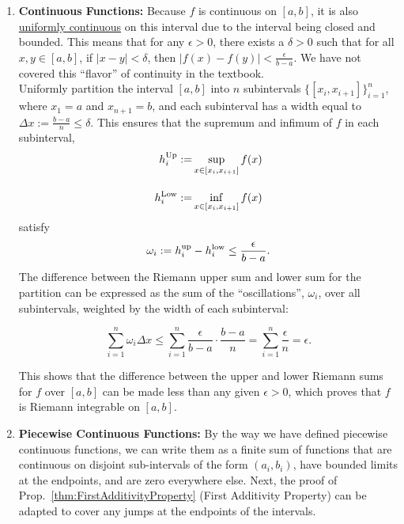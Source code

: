 \begin{enumerate}
\renewcommand{\labelenumi}{(\alph{enumi})}
    \setlength{\itemsep}{.2cm}
    \item \textbf{Continuous Functions: } Because $f$ is continuous on $[a,b]$, it is also \href{https://en.wikipedia.org/wiki/Uniform_continuity}{uniformly continuous} on this interval due to the interval being closed and bounded. This means that for any $\epsilon > 0$, there exists a $\delta > 0$ such that for all $x, y \in [a,b]$, if $|x - y| < \delta$, then $|f(x) - f(y)| < \frac{\epsilon}{b-a}$. We have not covered this ``flavor'' of continuity in the textbook.\\

Uniformly partition the interval $[a,b]$ into $n$ subintervals $\{[x_{i}, x_{i+1}]\}_{i=1}^{n}$, where $x_1 = a$ and $x_{n+1} = b$, and each subinterval has a width equal to $ \Delta x := \frac{b-a}{n} \le \delta$. This ensures that the supremum and infimum of $f$ in each subinterval,
\begin{align*}
h^{\rm Up}_i:=& \sup_{x \in [x_{i},x_{i+1}]} f (x) \\[1em] 
h^{\rm Low}_i:=& \inf_{ x \in [x_{i},x_{i+1}]} f(x)     
\end{align*} 
satisfy
$$ \omega_i:= h^{\rm up}_i - h^{\rm low}_i\le \frac{\epsilon}{b-a}.$$
The difference between the Riemann upper sum and lower sum for the partition  can be expressed as the sum of the ``oscillations'', $\omega_i$, over all subintervals, weighted by the width of each subinterval:

\[
\sum_{i=1}^{n} \omega_i \Delta x \le \sum_{i=1}^{n} \frac{\epsilon}{b-a} \cdot \frac{b-a}{n}  =  \sum_{i=1}^{n} \frac{\epsilon}{n} = \epsilon.
\]

This shows that the difference between the upper and lower Riemann sums for $f$ over $[a,b]$ can be made less than any given $\epsilon > 0$, which proves that $f$ is Riemann integrable on $[a,b]$.

\item \textbf{Piecewise Continuous Functions:} By the way we have defined piecewise continuous functions, we can write them as a finite sum of functions that are continuous on disjoint sub-intervals of the form $(a_i, b_i)$, have bounded limits at the endpoints, and are zero everywhere else. Next, the proof of Prop.~\ref{thm:FirstAdditivityProperty} (First Additivity Property) can be adapted to cover any jumps at the endpoints of the intervals. 
\end{enumerate}
\Qed